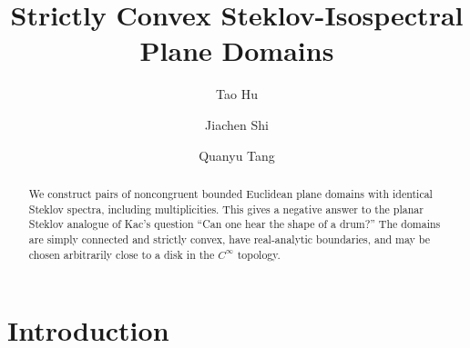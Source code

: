 \documentclass[11pt,letterpaper,reqno]{amsart}
\theoremstyle{definition}
\begin{document}
\title[Steklov-Isospectral Plane Domains]
{Strictly Convex Steklov-Isospectral Plane Domains}

\author[T.~Hu]{Tao Hu}
\address{
Department of Information, Risk, and Operations Management,
McCombs School of Business,
The University of Texas at Austin,
Austin, TX 78712, USA
}

\author[J.~Shi]{Jiachen Shi}
\address{School of Science, China University of Mining and Technology-Beijing, Beijing 100083, P.~R.~China}

\author[Q.~Tang]{Quanyu Tang}
\address{School of Mathematical Sciences, University of Science and Technology of China, Hefei 230026, P.~R.~China}




\begin{abstract}
We construct pairs of noncongruent bounded Euclidean plane domains with identical Steklov spectra, including multiplicities. This gives a negative answer to the planar Steklov analogue of Kac's question ``Can one hear the shape of a drum?'' The domains are simply connected and strictly convex, have real-analytic boundaries, and may be chosen arbitrarily close to a disk in the $C^\infty$ topology.
\end{abstract}




\maketitle




\section{Introduction}
\end{document}

